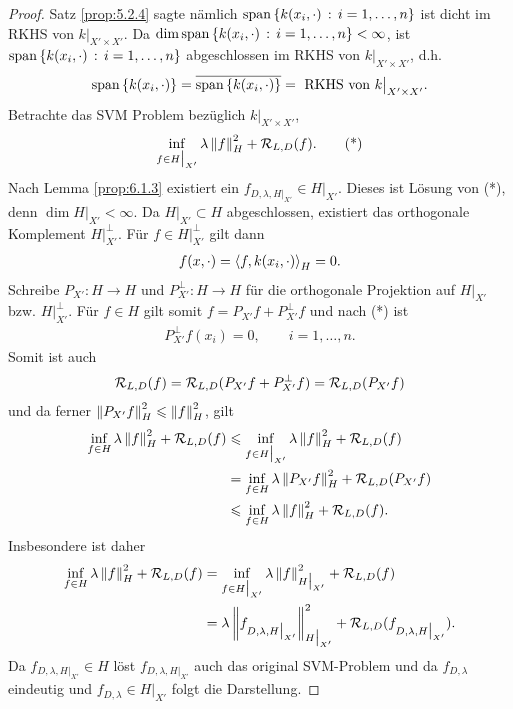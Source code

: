 \begin{proof}
Satz \ref{prop:5.2.4} sagte nämlich $\mathrm{span}
\left\{ k(x_i,\cdot)\,:\,i=1,\ldots,n\right\}$ ist dicht im RKHS von $k\big|_{X'\times
X'}$. Da $\dim \mathrm{span}
\left\{ k(x_i,\cdot)\,:\,i=1,\ldots,n\right\}<\infty$, ist $\mathrm{span}
\left\{ k(x_i,\cdot)\,:\,i=1,\ldots,n\right\}$ abgeschlossen im RKHS von
$k\big|_{X'\times X'}$, d.h.
\begin{align*}
\mathrm{span}
\left\{ k(x_i,\cdot) \right\} =
{\overline{\mathrm{span}
\left\{ k(x_i,\cdot) \right\}}}
=\text{ RKHS von }k\big|_{X'\times X'}.
\end{align*}
Betrachte das SVM Problem bezüglich $k\big|_{X'\times X'}$,
\begin{align*}
\inf_{f\in H\big|_{X'}} \lambda \left\|f\right\|_H^2 + \mathcal{R}_{L,D}(f).\tag{*}
\end{align*}
Nach Lemma \ref{prop:6.1.3} existiert ein $f_{D,\lambda,H\big|_{X'}}\in
H\big|_{X'}$. Dieses ist Lösung von (*), denn $\dim H\big|_{X'}< \infty$. Da $H\big|_{X'}\subset H$
abgeschlossen, existiert das orthogonale Komplement $H\big|_{X'}^\bot$. Für
$f\in H\big|_{X'}^\bot$ gilt dann
\begin{align*}
f(x,\cdot)= \left\langle f,k(x_i,\cdot)\right\rangle_H = 0.
\end{align*}
Schreibe $P_{X'}: H\to H$ und $P_{X'}^\bot :H\to H$ für die orthogonale
Projektion auf $H\big|_{X'}$ bzw. $H\big|_{X'}^\bot$.
Für $f\in H$ gilt somit $f=P_{X'}f + P_{X'}^\bot f$ und nach (*) ist
\begin{align*}
P_{X'}^\bot f(x_i) = 0,\qquad i=1,\ldots,n.
\end{align*}
Somit ist auch
\begin{align*}
\mathcal{R}_{L,D}(f) = \mathcal{R}_{L,D}(P_{X'}f + P_{X'}^\bot f) = \mathcal{R}_{L,D}(
P_{X'} f)
\end{align*}
und da ferner $\left\|P_{X'} f\right\|_{H}^2\leqslant \left\|f\right\|_H^2$, gilt
\begin{align*}
\inf_{f\in H} \lambda\left\|f\right\|_H^2  + \mathcal{R}_{L,D}(f)
&\leqslant 
\inf_{f\in H\big|_{X'}} \lambda\left\|f\right\|_H^2  + \mathcal{R}_{L,D}(f)\\
&=
\inf_{f\in H} \lambda\left\|P_{X'}f\right\|_H^2  + \mathcal{R}_{L,D}(P_{X'}f)\\
&\leqslant
\inf_{f\in H} \lambda\left\|f\right\|_H^2  + \mathcal{R}_{L,D}(f).  
\end{align*}
Insbesondere ist daher
\begin{align*}
\inf_{f\in H} \lambda\left\|f\right\|_H^2  + \mathcal{R}_{L,D}(f)
&=
\inf_{f\in H\big|_{X'}} \lambda\left\|f\right\|_{H\big|_{X'}}^2  + \mathcal{R}_{L,D}(f)\\
&=
\lambda\left\|f_{D,\lambda,H\big|_{X'}}\right\|_{H\big|_{X'}}^2  +
\mathcal{R}_{L,D}(f_{D,\lambda,H\big|_{X'}}).
\end{align*}
Da $f_{D,\lambda,H\big|_{X'}} \in H$ löst $f_{D,\lambda,H\big|_{X'}}$ auch das
original SVM-Problem und da $f_{D,\lambda}$ eindeutig und $f_{D,\lambda}\in
H\big|_{X'}$ folgt die Darstellung.\qedhere
\end{proof}

